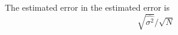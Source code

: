 \documentclass[preprint2]{aastex}
\begin{document}
The estimated
error in the estimated error is
\begin{equation}
\sqrt{\hat{\sigma^{2}}}/\sqrt{N}
\label{eqn:errorsigmamean}
\end{equation}










\end{document}
